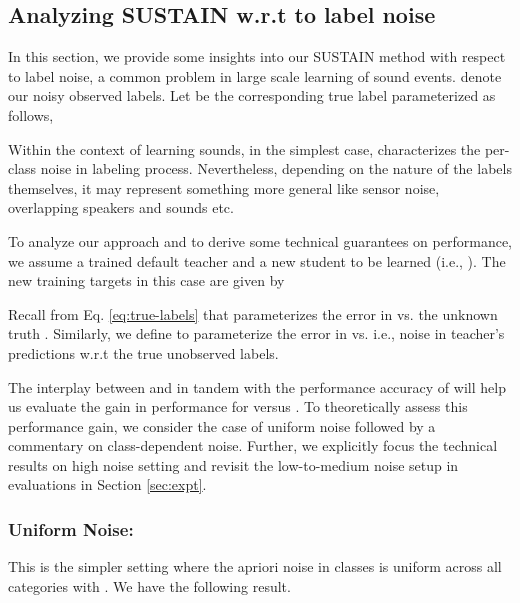 \documentclass{article}
\begin{document}
\subsection{Analyzing SUSTAIN w.r.t to label noise} \label{sec:analysis}

In this section, we provide some insights into our SUSTAIN method with respect to label noise, a common problem in large scale learning of sound events.  denote our noisy observed labels. Let  be the corresponding true label parameterized as follows,
  
Within the context of learning sounds, in the simplest case,  characterizes the per-class noise in labeling process. Nevertheless, depending on the nature of the labels themselves, it may represent something more general like sensor noise, overlapping speakers and sounds etc. 

To analyze our approach and to derive some technical guarantees on performance, we assume a trained default teacher  and a new student to be learned (i.e., ). The new training targets in this case are given by


Recall from Eq. \ref{eq:true-labels} that  parameterizes the error in  vs. the unknown truth .
Similarly, we define  to parameterize the error in  vs.  i.e., noise in teacher's predictions w.r.t the true unobserved labels. 

  
The interplay between  and  in tandem with the performance accuracy of  will help us evaluate the gain in performance for  versus . 
To theoretically assess this performance gain, we consider the case of uniform noise  followed by a commentary on class-dependent noise. 
Further, we explicitly focus the technical results on high noise setting and revisit the low-to-medium noise setup in evaluations in Section \ref{sec:expt}. 

\subsubsection{Uniform Noise: } \label{sec:same-noise}

This is the simpler setting where the apriori noise in classes is uniform across all categories with . We have the following result. 
\end{document}
